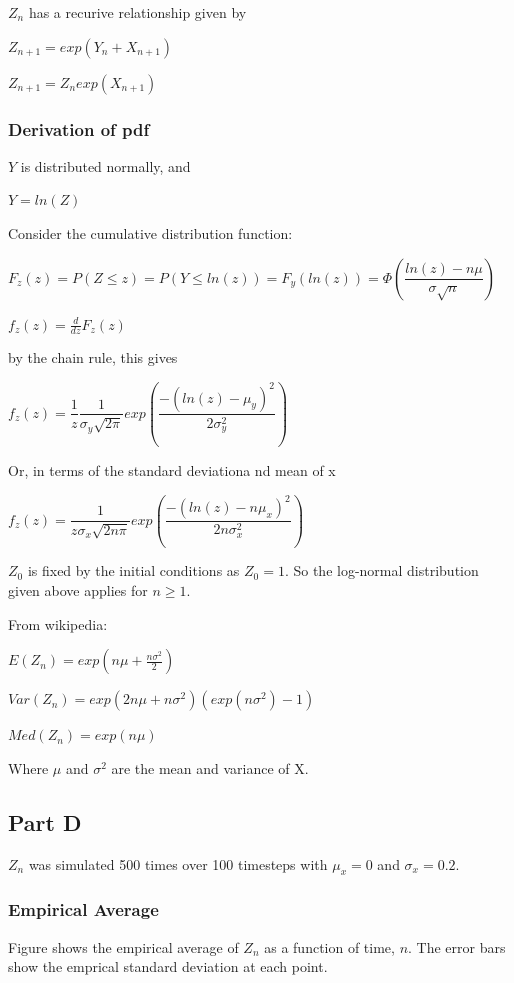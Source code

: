 \documentclass{article}
\begin{document}
$Z_n$ has a recurive relationship given by

$Z_{n+1} = exp(Y_n + X_{n+1})$

$Z_{n+1} = Z_n exp(X_{n+1})$

\subsubsection{Derivation of pdf}

$Y$ is distributed normally, and

$Y = ln(Z)$

\bigskip

Consider the cumulative distribution function:


$F_z(z) = P(Z \leq z) = P(Y \leq ln(z)) = F_y(ln(z)) = \Phi(\dfrac{ln(z) - n\mu}{\sigma \sqrt{n}})$

$f_z(z) = \frac{d}{dz}F_z(z)$

by the chain rule, this gives

$f_z(z) = \dfrac{1}{z} \dfrac{1}{\sigma_y \sqrt{2\pi}}exp(\dfrac{-(ln(z)-\mu_y)^2}{2\sigma_y^2})$

Or, in terms of the standard deviationa nd mean of x

$f_z(z) = \dfrac{1}{z\sigma_x \sqrt{2n\pi}}exp(\dfrac{-(ln(z)-n\mu_x)^2}{2n\sigma_x^2})$

$Z_0$ is fixed by the initial conditions as $Z_0=1$. So the log-normal distribution given above applies for $n \geq 1$.

\bigskip

From wikipedia: 

$E(Z_n) = exp(n\mu + \frac{n\sigma^2}{2})$

$Var(Z_n) = exp(2n \mu + n\sigma^2)(exp(n\sigma^2)-1)$

$Med(Z_n) = exp(n\mu)$

Where $\mu$ and $\sigma^2$ are the mean and variance of X.

\subsection{Part D}
$Z_n$ was simulated 500 times over 100 timesteps with $\mu_x=0$ and $\sigma_x=0.2$. 

\subsubsection{Empirical Average}
Figure shows the empirical average of $Z_n$ as a function of time, $n$. The error bars show the emprical standard deviation at each point.
\end{document}

